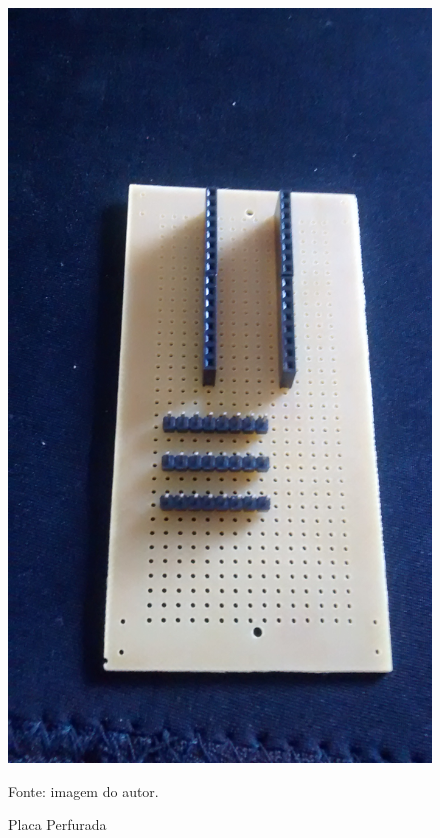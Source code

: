		\begin{figure}[h]
			\centering
			\includegraphics[keepaspectratio=true,scale=0.075]{figuras/placa_furada.jpg}
			\caption{Placa Perfurada}
			\footnotesize Fonte: imagem do autor. 
			\label{placa}	
		\end{figure}
	
